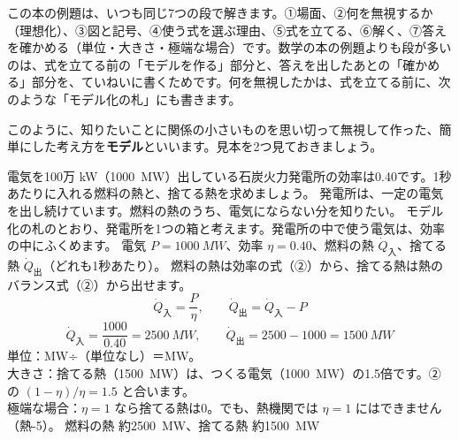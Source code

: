 \leavevmode\label{ph:熱-0:sec3}この本の例題は、いつも同じ7つの段で解きます。①場面、②何を無視するか（理想化）、③図と記号、④使う式を選ぶ理由、⑤式を立てる、⑥解く、⑦答えを確かめる（単位・大きさ・極端な場合）です。数学の本の例題よりも段が多いのは、式を立てる前の「モデルを作る」部分と、答えを出したあとの「確かめる」部分を、ていねいに書くためです。何を無視したかは、式を立てる前に、次のような「モデル化の札」にも書きます。
\begin{phmodel}
\end{phmodel}
このように、知りたいことに関係の小さいものを思い切って無視して作った、簡単にした考え方を\textbf{モデル}といいます。見本を2つ見ておきましょう。

\begin{phreidai}\label{ph:熱-0:ex1}
電気を100万 kW（\qty{1000}{MW}）出している石炭火力発電所の効率は0.40です。1秒あたりに入れる燃料の熱と、捨てる熱を求めましょう。
\phbamen
発電所は、一定の電気を出し続けています。燃料の熱のうち、電気にならない分を知りたい。
\phmushi
モデル化の札のとおり、発電所を1つの箱と考えます。発電所の中で使う電気は、効率の中にふくめます。
\phzu
電気 $P=\qty{1000}{MW}$、効率 $\eta=0.40$、燃料の熱 $\dot Q_{\text{入}}$、捨てる熱 $\dot Q_{\text{出}}$（どれも1秒あたり）。
\phriyu
燃料の熱は効率の式（②）から、捨てる熱は熱のバランス式（②）から出せます。
\phtateru
\[\dot Q_{\text{入}}=\frac{P}{\eta},\qquad \dot Q_{\text{出}}=\dot Q_{\text{入}}-P\]
\phtoku
\[\dot Q_{\text{入}}=\frac{1000}{0.40}=\qty{2500}{MW},\qquad \dot Q_{\text{出}}=2500-1000=\qty{1500}{MW}\]
\phtashikame
単位：MW÷（単位なし）＝MW。\\
大きさ：捨てる熱（\qty{1500}{MW}）は、つくる電気（\qty{1000}{MW}）の1.5倍です。②の $(1-\eta)/\eta=1.5$ と合います。\\
極端な場合：$\eta=1$ なら捨てる熱は0。でも、熱機関では $\eta=1$ にはできません（熱-5）。
\kotae 燃料の熱 約\qty{2500}{MW}、捨てる熱 約\qty{1500}{MW}
\end{phreidai}

